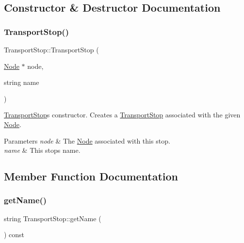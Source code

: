\subsection{Constructor \& Destructor Documentation}
\hypertarget{class_transport_stop_ab41c7393ddb45b59cc172724eff2ff77}{}\label{class_transport_stop_ab41c7393ddb45b59cc172724eff2ff77} 
\subsubsection{\texorpdfstring{Transport\+Stop()}{TransportStop()}}
{\footnotesize\ttfamily Transport\+Stop\+::\+Transport\+Stop (\begin{DoxyParamCaption}\item[{\hyperlink{class_node}{Node} $\ast$}]{node,  }\item[{string}]{name }\end{DoxyParamCaption})}

\hyperlink{class_transport_stop}{Transport\+Stop}\textquotesingle{}s constructor. Creates a \hyperlink{class_transport_stop}{Transport\+Stop} associated with the given \hyperlink{class_node}{Node}.


\begin{DoxyParams}{Parameters}
{\em node} & The \hyperlink{class_node}{Node} associated with this stop. \\
\hline
{\em name} & This stop\textquotesingle{}s name. \\
\hline
\end{DoxyParams}


\subsection{Member Function Documentation}
\hypertarget{class_transport_stop_ac4e1999cbad5b9d6e25c9abee0649064}{}\label{class_transport_stop_ac4e1999cbad5b9d6e25c9abee0649064} 
\subsubsection{\texorpdfstring{get\+Name()}{getName()}}
{\footnotesize\ttfamily string Transport\+Stop\+::get\+Name (\begin{DoxyParamCaption}{ }\end{DoxyParamCaption}) const}

